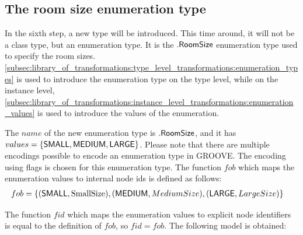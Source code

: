 \subsection{The room size enumeration type}
\label{sec:application:building_the_model:the_room_size_enumeration_type}

In the sixth step, a new type will be introduced. This time around, it will not be a class type, but an enumeration type. It is the $.\mathsf{RoomSize}$ enumeration type used to specify the room sizes. \cref{subsec:library_of_transformations:type_level_transformations:enumeration_types} is used to introduce the enumeration type on the type level, while on the instance level, \cref{subsec:library_of_transformations:instance_level_transformations:enumeration_values} is used to introduce the values of the enumeration.

The $name$ of the new enumeration type is $.\mathsf{RoomSize}$, and it has $values = \{\mathsf{SMALL}, \mathsf{MEDIUM}, \mathsf{LARGE}\}$. Please note that there are multiple encodings possible to encode an enumeration type in GROOVE. The encoding using flags is chosen for this enumeration type. The function $fob$ which maps the enumeration values to internal node ids is defined as follows:
\begin{align*}
    fob = \{&(\mathsf{SMALL}, \text{SmallSize}), (\mathsf{MEDIUM}, MediumSize), (\mathsf{LARGE}, LargeSize)\}
\end{align*}

The function $fid$ which maps the enumeration values to explicit node identifiers is equal to the definition of $fob$, so $fid = fob$. The following model is obtained:


